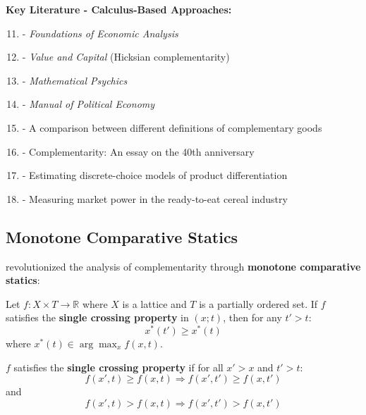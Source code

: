 \textbf{Key Literature - Calculus-Based Approaches:}
\begin{enumerate}[noitemsep]
    \setcounter{enumi}{10}
    \item \citet{samuelson1947} - \textit{Foundations of Economic Analysis}
    \item \citet{hicks1939} - \textit{Value and Capital} (Hicksian complementarity)
    \item \citet{edgeworth1881} - \textit{Mathematical Psychics}
    \item \citet{pareto1906} - \textit{Manual of Political Economy}
    \item \citet{allen1934} - A comparison between different definitions of complementary goods
    \item \citet{samuelson1974} - Complementarity: An essay on the 40th anniversary
    \item \citet{berry1994} - Estimating discrete-choice models of product differentiation
    \item \citet{nevo2001} - Measuring market power in the ready-to-eat cereal industry
\end{enumerate}

\subsection{Monotone Comparative Statics}
\label{subsec:monotone-statics}

\citet{milgrom1994} revolutionized the analysis of complementarity through \textbf{monotone comparative statics}:

\begin{theorem}
\label{thm:milgrom-shannon}
Let $f: X \times T \to \mathbb{R}$ where $X$ is a lattice and $T$ is a partially ordered set. If $f$ satisfies the \textbf{single crossing property} in $(x; t)$, then for any $t' > t$:
\begin{equation}
x^*(t') \geq x^*(t)
\end{equation}
where $x^*(t) \in \arg\max_x f(x, t)$.
\end{theorem}

\begin{definition}
$f$ satisfies the \textbf{single crossing property} if for all $x' > x$ and $t' > t$:
\begin{equation}
f(x', t) \geq f(x, t) \Rightarrow f(x', t') \geq f(x, t')
\end{equation}
and
\begin{equation}
f(x', t) > f(x, t) \Rightarrow f(x', t') > f(x, t')
\end{equation}
\end{definition}

